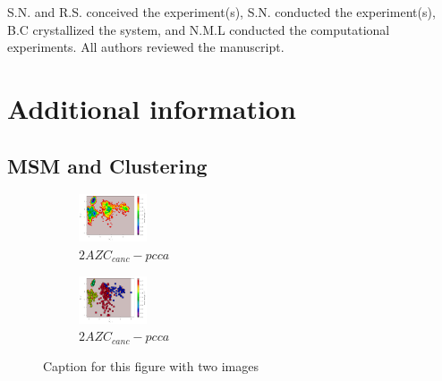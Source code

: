 \documentclass[fleqn,10pt]{wlscirep}
\begin{document}
S.N. and R.S. conceived the experiment(s), S.N. conducted the experiment(s),  B.C crystallized the system, and N.M.L conducted the computational experiments.  All authors reviewed the manuscript. 

\section{Additional information}

\subsection{MSM and Clustering}

\begin{figure}[!ht]
\centering
\begin{subfigure}{.5\textwidth}
  \centering
  \includegraphics[width=.9\linewidth]{2AZC_canc/2AZC_canc-tica.pdf}
  \caption{$2AZC_{canc}-pcca$}
  \label{sup:2AZC_canc-tica}
\end{subfigure}%
\begin{subfigure}{.5\textwidth}
  \centering
  \includegraphics[width=.9\linewidth]{2AZC_canc/2AZC_canc-pcca.pdf}
  \caption{$2AZC_{canc}-pcca$}
  \label{sup:2AZC_canc-pcca}
\end{subfigure}
\caption{Caption for this figure with two images}
\label{sup:2AZC_canc-cluster}
\end{figure}
\end{document}
